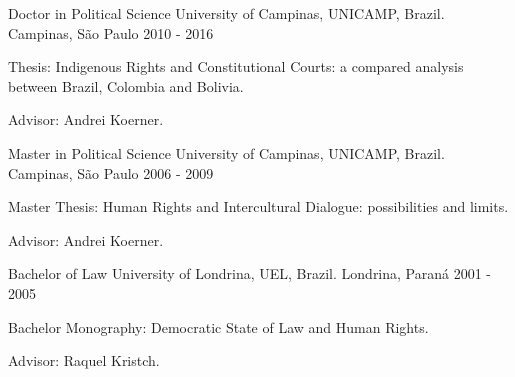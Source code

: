 \begin{cventries}
\cventry
{Doctor in Political Science} %
{University of Campinas, UNICAMP, Brazil.} %
{Campinas, São Paulo} %
{2010 - 2016} %
{
  \begin{cvitems} %
    \item Thesis: Indigenous Rights and Constitutional Courts: a compared analysis between Brazil, Colombia and Bolivia.
    \item Advisor: Andrei Koerner.
  \end{cvitems}
}

\cventry
{Master in Political Science}
{University of Campinas, UNICAMP, Brazil.}
{Campinas, São Paulo}
{2006 - 2009}
{
\begin{cvitems}
  \item Master Thesis: Human Rights and Intercultural Dialogue: possibilities and limits.
  \item Advisor: Andrei Koerner.
 \end{cvitems}
}

\cventry
{Bachelor of Law}
{University of Londrina, UEL, Brazil.}
{Londrina, Paraná}
{2001 - 2005}
{
\begin{cvitems}
  \item Bachelor Monography: Democratic State of Law and Human Rights.
  \item Advisor: Raquel Kristch.
 \end{cvitems}
}

\end{cventries}
